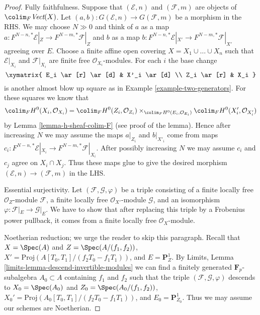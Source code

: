 \begin{proof}
Fully faithfulness. Suppose that $(\mathcal{E}, n)$ and
$(\mathcal{F}, m)$ are objects of $\colim_F \textit{Vect}(X)$.
Let $(a, b) : G(\mathcal{E}, n) \to G(\mathcal{F}, m)$
be a morphism in the RHS. We may choose $N \gg 0$ and
think of $a$ as a map
$a : F^{N - n, *}\mathcal{E}|_Z \to F^{N - m, *}\mathcal{F}|_Z$
and $b$ as a map
$b : F^{N - n, *}\mathcal{E}|_{X'} \to F^{N - m, *}\mathcal{F}|_{X'}$
agreeing over $E$.
Choose a finite affine open covering
$X = X_1 \cup \ldots \cup X_n$ such that $\mathcal{E}|_{X_i}$
and $\mathcal{F}|_{X_i}$ are finite free $\mathcal{O}_{X_i}$-modules.
For each $i$ the base change
$$
\xymatrix{
E_i \ar[r] \ar[d] & X'_i \ar[d] \\
Z_i \ar[r] & X_i
}
$$
is another almost blow up square as in Example \ref{example-two-generators}.
For these squares we know that
$$
\colim_F H^0(X_i, \mathcal{O}_{X_i}) =
\colim_F H^0(Z_i, \mathcal{O}_{Z_i})
\times_{\colim_F H^0(E_i, \mathcal{O}_{E_i})}
\colim_F H^0(X'_i, \mathcal{O}_{X'_i})
$$
by Lemma \ref{lemma-h-sheaf-colim-F} (see proof of the lemma).
Hence after increasing $N$ we may assume
the maps $a|_{Z_i}$ and $b|_{X'_i}$ come from
maps $c_i : F^{N - n, *}\mathcal{E}|_{X_i} \to F^{N - m, *}\mathcal{F}|_{X_i}$.
After possibly increasing $N$ we may assume $c_i$ and $c_j$
agree on $X_i \cap X_j$. Thus these maps glue to give the
desired morphism $(\mathcal{E}, n) \to (\mathcal{F}, m)$
in the LHS.

\medskip\noindent
Essential surjectivity. Let $(\mathcal{F}, \mathcal{G}, \varphi)$ be a
triple consisting of
a finite locally free $\mathcal{O}_Z$-module $\mathcal{F}$,
a finite locally free $\mathcal{O}_{X'}$-module $\mathcal{G}$, and
an isomorphism $\varphi : \mathcal{F}|_E \to \mathcal{G}|_E$.
We have to show that after replacing this triple by a Frobenius
power pullback, it comes from a finite locally free $\mathcal{O}_X$-module.

\medskip\noindent
Noetherian reduction; we urge the reader to skip this paragraph.
Recall that $X = \Spec(A)$ and $Z = \Spec(A/(f_1, f_2))$,
$X' = \text{Proj}(A[T_0, T_1]/(f_2T_0 - f_1T_1))$, and
$E = \mathbf{P}^1_Z$. By Limits, Lemma
\ref{limits-lemma-descend-invertible-modules}
we can find a finitely generated $\mathbf{F}_p$-subalgebra
$A_0 \subset A$ containing $f_1$ and $f_2$ such that the triple
$(\mathcal{F}, \mathcal{G}, \varphi)$ descends to
$X_0 = \Spec(A_0)$ and $Z_0 = \Spec(A_0/(f_1, f_2))$,
$X_0' = \text{Proj}(A_0[T_0, T_1]/(f_2T_0 - f_1T_1))$, and
$E_0 = \mathbf{P}^1_{Z_0}$. Thus we may assume our schemes
are Noetherian.


\end{proof}
